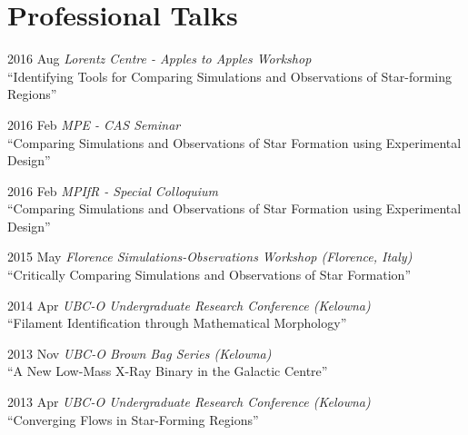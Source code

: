 \documentclass[letterpaper,11pt]{article}
\newlength{\mainindent} \setlength{\mainindent}{12pt}
\newlength{\contentindent} \setlength{\contentindent}{19ex}
\newenvironment{datelist}{
  \begingroup
  \raggedright
  \begin{description}[labelindent=\mainindent,leftmargin=\contentindent,
      style=sameline,font=\normalfont,topsep=0pt,partopsep=0pt,parsep=0pt,
      itemsep=4pt]
}{
  \end{description}
  \endgroup
}
\begin{document}




\section*{Professional Talks}
\begin{datelist}
\item[2016 Aug] \emph{Lorentz Centre - Apples to Apples Workshop} \\ ``Identifying Tools for Comparing Simulations and Observations of Star-forming Regions''
\item[2016 Feb] \emph{MPE - CAS Seminar} \\ ``Comparing Simulations and Observations of Star Formation using Experimental Design''
\item[2016 Feb] \emph{MPIfR - Special Colloquium} \\ ``Comparing Simulations and Observations of Star Formation using Experimental Design''
\item[2015 May] \emph{Florence Simulations-Observations Workshop (Florence, Italy)} \\ ``Critically Comparing Simulations and Observations of Star Formation''
\item[2014 Apr] \emph{UBC-O Undergraduate Research Conference (Kelowna)} \\ ``Filament Identification through Mathematical Morphology''
\item[2013 Nov] \emph{UBC-O Brown Bag Series (Kelowna)} \\ ``A New Low-Mass X-Ray Binary in the Galactic Centre''
\item[2013 Apr] \emph{UBC-O Undergraduate Research Conference (Kelowna)} \\ ``Converging Flows in Star-Forming Regions''
\end{datelist}
\end{document}
